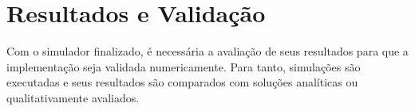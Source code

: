 



\section{Resultados e Validação}

Com o simulador finalizado, é necessária a avaliação de seus resultados para que a implementação seja validada numericamente. Para tanto, simulações são executadas e seus resultados são comparados com soluções analíticas ou qualitativamente avaliados.

